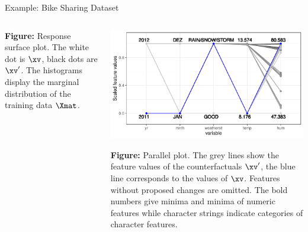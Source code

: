 \documentclass[11pt,compress,t,notes=noshow, xcolor=table]{beamer}
\begin{document}
\begin{vbframe}{Example: Bike Sharing Dataset}
\begin{columns}
\begin{column}{0.5\textwidth}
			\scriptsize{\textbf{Figure:} Response surface plot. 
				The white dot is $\xv$, black dots are $\xv'$. The histograms display the marginal distribution of the training data $\Xmat$.} 
				
		\end{column}
		\begin{column}{0.5\textwidth}  
			\begin{center}
				\includegraphics[width=1\textwidth]{figure/counterfactuals_bike_para}
			\end{center}
		
		\scriptsize{\textbf{Figure:} Parallel plot. 
			The grey lines show the feature values of the counterfactuals $\xv'$, the blue line corresponds to the values of $\xv$. Features without proposed changes are omitted. The bold numbers give minima and minima of numeric features while character strings indicate categories of character features.} 
		
		\end{column}
	\end{columns}
\end{vbframe}
\end{document}
